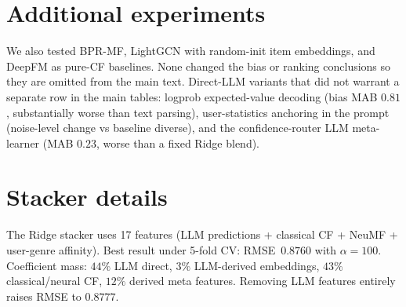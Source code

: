 \documentclass[11pt,a4paper]{article}
\begin{document}
\section{Additional experiments}
We also tested BPR-MF, LightGCN with random-init item embeddings, and
DeepFM as pure-CF baselines. None changed the bias or ranking conclusions
so they are omitted from the main text. Direct-LLM variants that did not
warrant a separate row in the main tables: logprob expected-value
decoding (bias MAB $0.81$, substantially worse than text parsing),
user-statistics anchoring in the prompt (noise-level change vs baseline
diverse), and the confidence-router LLM meta-learner (MAB $0.23$, worse
than a fixed Ridge blend).

\section{Stacker details}
The Ridge stacker uses 17 features (LLM predictions + classical CF
+ NeuMF + user-genre affinity). Best result under 5-fold CV:
RMSE~$0.8760$ with $\alpha{=}100$. Coefficient mass: $44\%$ LLM direct,
$3\%$ LLM-derived embeddings, $43\%$ classical/neural CF, $12\%$
derived meta features. Removing LLM features entirely raises RMSE to
$0.8777$.
\end{document}
